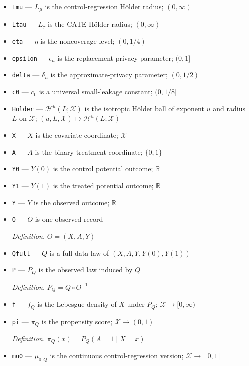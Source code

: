 \documentclass{article}
\begin{document}
\begin{itemize}
  \item \texttt{Lmu} --- \(L_\mu\) is the control-regression Hölder radius; \((0,\infty)\)
  \item \texttt{Ltau} --- \(L_\tau\) is the CATE Hölder radius; \((0,\infty)\)
  \item \texttt{eta} --- \(\eta\) is the noncoverage level; \((0,1/4)\)
  \item \texttt{epsilon} --- \(\epsilon_n\) is the replacement-privacy parameter; \((0,1]\)
  \item \texttt{delta} --- \(\delta_n\) is the approximate-privacy parameter; \((0,1/2)\)
  \item \texttt{c0} --- \(c_0\) is a universal small-leakage constant; \((0,1/8]\)
  \item \texttt{Holder} --- \(\mathcal H^u(L;\mathcal X)\) is the isotropic Hölder ball of exponent \(u\) and radius \(L\) on \(\mathcal X\); \((u,L,\mathcal X)\mapsto\mathcal H^u(L;\mathcal X)\)
  \item \texttt{X} --- \(X\) is the covariate coordinate; \(\mathcal X\)
  \item \texttt{A} --- \(A\) is the binary treatment coordinate; \(\{0,1\}\)
  \item \texttt{Y0} --- \(Y(0)\) is the control potential outcome; \(\mathbb R\)
  \item \texttt{Y1} --- \(Y(1)\) is the treated potential outcome; \(\mathbb R\)
  \item \texttt{Y} --- \(Y\) is the observed outcome; \(\mathbb R\)
  \item \texttt{O} --- \(O\) is one observed record
  \par\smallskip\noindent\emph{Definition.} \(O=(X,A,Y)\)
  \item \texttt{Qfull} --- \(Q\) is a full-data law of \((X,A,Y,Y(0),Y(1))\)
  \item \texttt{P} --- \(P_Q\) is the observed law induced by \(Q\)
  \par\smallskip\noindent\emph{Definition.} \(P_Q=Q\circ O^{-1}\)
  \item \texttt{f} --- \(f_Q\) is the Lebesgue density of \(X\) under \(P_Q\); \(\mathcal X\to[0,\infty)\)
  \item \texttt{pi} --- \(\pi_Q\) is the propensity score; \(\mathcal X\to(0,1)\)
  \par\smallskip\noindent\emph{Definition.} \(\pi_Q(x)=P_Q(A=1\mid X=x)\)
  \item \texttt{mu0} --- \(\mu_{0,Q}\) is the continuous control-regression version; \(\mathcal X\to[0,1]\)

\end{itemize}
\end{document}
